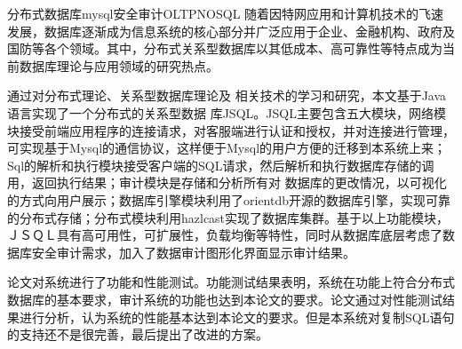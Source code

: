 
\begin{Cabstract}{分布式数据库}{mysql}{安全审计}{OLTP}{NOSQL}
随着因特网应用和计算机技术的飞速发展，数据库逐渐成为信息系统的核心部分并广泛应用于企业、金融机构、政府及国防等各个领域。其中，分布式关系型数据库以其低成本、高可靠性等特点成为当前数据库理论与应用领域的研究热点。

通过对分布式理论、关系型数据库理论及 相关技术的学习和研究，本文基于Java语言实现了一个分布式的关系型数据 库JSQL。JSQL主要包含五大模块，网络模块接受前端应用程序的连接请求，对客服端进行认证和授权，并对连接进行管理，可实现基于Mysql的通信协议，这样便于Mysql的用户方便的迁移到本系统上来；Sql的解析和执行模块接受客户端的SQL请求，然后解析和执行数据库存储的调用，返回执行结果；审计模块是存储和分析所有对 数据库的更改情况，以可视化的方式向用户展示；数据库引擎模块利用了orientdb开源的数据库引擎，实现可靠的分布式存储；分布式模块利用hazlcast实现了数据库集群。基于以上功能模块，ＪＳＱＬ具有高可用性，可扩展性，负载均衡等特性，同时从数据库底层考虑了数据库安全审计需求，加入了数据审计图形化界面显示审计结果。

论文对系统进行了功能和性能测试。功能测试结果表明，系统在功能上符合分布式数据库的基本要求，审计系统的功能也达到本论文的要求。论文通过对性能测试结果进行分析，认为系统的性能基本达到本论文的要求。但是本系统对复制SQL语句的支持还不是很完善，最后提出了改进的方案。
\end{Cabstract}